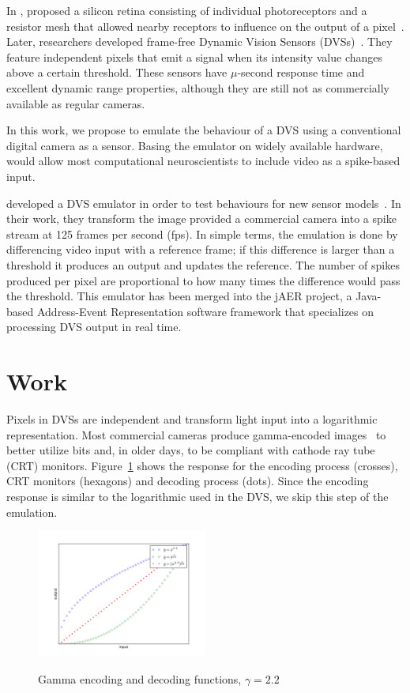\documentclass[twocolumn]{article}
\begin{document}
In \citeyear{Mead1989}, \citeauthor{Mead1989} proposed a silicon retina consisting of individual photoreceptors and a resistor mesh that allowed nearby receptors to influence on the output of a pixel~\cite{Mead1989}. 
Later, researchers developed frame-free Dynamic Vision Sensors (DVSs)~\cite{delbruck_dvs,bernabe_dvs}. They feature independent pixels that emit a signal when its intensity value changes above a certain threshold. These sensors have $\mu$-second response time and excellent dynamic range properties, although they are still not as commercially available as regular cameras.

In this work, we propose to emulate the behaviour of a DVS using a conventional digital camera as a sensor. Basing the emulator on widely available hardware, would allow most computational neuroscientists to include video as a spike-based input.


\citeauthor{dvs_emu} developed a DVS emulator in order to test behaviours for new sensor models~\cite{dvs_emu}. In their work, they transform the image provided a commercial camera into a spike stream at 125 frames per second (fps). In simple terms, the emulation is done by differencing video input with a reference frame; if this difference is larger than a threshold it produces an output and updates the reference. The number of spikes produced per pixel are proportional to how many times the difference would pass the threshold. This emulator has been merged into the jAER project, a Java-based Address-Event Representation software framework that specializes on processing DVS output in real time.


\section{Work}

Pixels in DVSs are independent and transform light input into a logarithmic representation. Most commercial cameras produce gamma-encoded images~\cite{Poynton_digital_video} to better utilize bits and, in older days, to be compliant with cathode ray tube (CRT) monitors. Figure~\ref{fig:gamma_coding} shows the response for the encoding process (crosses), CRT monitors (hexagons) and decoding process (dots). Since the encoding response is similar to the logarithmic used in the DVS, we skip this step of the emulation.

\begin{figure}[htb]
  \includegraphics[width=0.5\textwidth]{gamma_coding}
  \label{fig:gamma_coding}
  \caption{Gamma encoding and decoding functions, $\gamma = 2.2$}
\end{figure}
\end{document}
